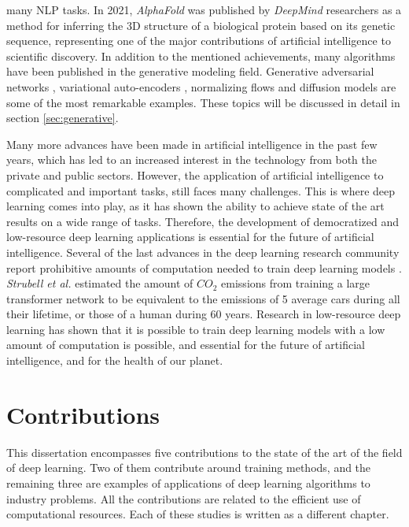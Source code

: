 many NLP tasks. In 2021, \textit{AlphaFold} was published by \textit{DeepMind} researchers \autocite{Jumper2021} as a method for inferring the 3D structure of a biological protein based on its genetic sequence, representing one of the major contributions of artificial intelligence to scientific discovery. In addition to the mentioned achievements, many algorithms have been published in the generative modeling field. Generative adversarial networks \autocite{Goodfellow2014}, variational auto-encoders \autocite{kingma2019}, normalizing flows \autocite{kingma2016, kobyzev} and diffusion models \autocite{Prafulla2021} are some of the most remarkable examples. These topics will be discussed in detail in section \ref{sec:generative}.

Many more advances have been made in artificial intelligence in the past few years, which has led to an increased interest in the technology from both the private and public sectors. However, the application of artificial intelligence to complicated and important tasks, still faces many challenges. This is where deep learning comes into play, as it has shown the ability to achieve state of the art results on a wide range of tasks. Therefore, the development of democratized and low-resource deep learning applications is essential for the future of artificial intelligence. Several of the last advances in the deep learning research community report prohibitive amounts of computation needed to train deep learning models \autocite{silver2016, kechyn2018, brown2020, floridi2020}. \textit{Strubell et al.} \autocite{strubell2019} estimated the amount of $CO_2$ emissions from training a large transformer network to be equivalent to the emissions of 5 average cars during all their lifetime, or those of a human during 60 years. Research in low-resource deep learning \autocite{howard2017, Han2017, Gao2018, sanchez2020, so2021} has shown that it is possible to train deep learning models with a low amount of computation is possible, and essential for the future of artificial intelligence, and for the health of our planet.


\section{Contributions}
This dissertation encompasses five contributions to the state of the art of the field of deep learning. Two of them contribute around training methods, and the remaining three are examples of applications of deep learning algorithms to industry problems. All the contributions are related to the efficient use of computational resources. Each of these studies is written as a different chapter.

